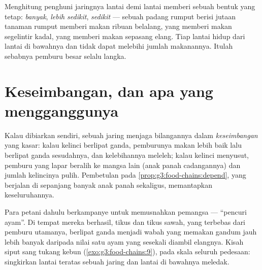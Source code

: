 \begin{proposition}\label{prop:g5:food-webs:pyramid}
Menghitung penghuni jaringnya lantai demi lantai memberi sebuah bentuk
yang tetap:  \emph{banyak},  \emph{lebih sedikit},
 \emph{sedikit} --- sebuah padang rumput berisi jutaan
tanaman rumput memberi makan ribuan belalang, yang memberi makan
segelintir kadal, yang memberi makan sepasang elang. Tiap lantai hidup
dari lantai di bawahnya dan tidak dapat melebihi jumlah makanannya.
Itulah sebabnya pemburu besar selalu langka.
\end{proposition}
\admitted

\section{Keseimbangan, dan apa yang mengganggunya}

\begin{proposition}\label{prop:g5:food-webs:balance}
Kalau dibiarkan sendiri, sebuah jaring menjaga bilangannya dalam
\emph{keseimbangan} yang kasar:
kalau kelinci berlipat ganda, pemburunya makan lebih baik lalu
berlipat ganda sesudahnya, dan kelebihannya meleleh; kalau kelinci
menyusut, pemburu yang lapar beralih ke mangsa lain (anak panah
cadangannya) dan jumlah kelincinya pulih. Pembetulan pada
\cref{prop:g3:food-chains:depend}, yang berjalan di sepanjang banyak
anak panah sekaligus, memantapkan keseluruhannya.
\end{proposition}
\admitted

\begin{example}\label{ex:g5:food-webs:mistake}
Para petani dahulu berkampanye untuk memusnahkan  pemangsa ---
``pencuri ayam''. Di tempat mereka berhasil, tikus dan tikus sawah,
yang terbebas dari pemburu utamanya, berlipat ganda menjadi wabah yang
memakan gandum jauh lebih banyak daripada nilai satu ayam yang sesekali
diambil elangnya. Kisah siput sang tukang kebun
(\cref{exo:g3:food-chains:9}), pada skala seluruh pedesaan:
singkirkan lantai teratas sebuah jaring dan lantai di bawahnya
meledak.
\end{example}

